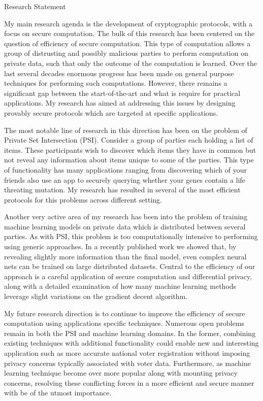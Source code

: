 \documentclass{resume} %
\begin{document}
	
	
	\begin{rSection}{Research Statement}
		
		My main research agenda is the development of cryptographic protocols, with a focus on secure computation. The bulk of this research has been centered on the question of efficiency of secure computation. This type of computation allows a group of distrusting and possibly malicious parties to perform computation on private data, such that only the outcome of the computation is learned. Over the last several decades enormous progress has been made on general purpose techniques for performing such computations. However, there remains a significant gap between the start-of-the-art and what is require for practical applications. My research has aimed at addressing this issues by designing provably secure protocols which are targeted at specific applications.
		
		The most notable line of research in this direction has been on the problem of Private Set Intersection (PSI). Consider a group of parties each holding a list of items. These participants wish to discover which items they have in common but not reveal any  information about items unique to some of the parties. This type of functionality has many applications ranging from discovering which of your friends also use an app to securely querying whether your genes contain a life threating mutation. My research has resulted in several of the most efficient protocols for this problems across different setting.
		
		Another very active area of my research has been into the problem of training machine learning models on private data which is distributed between several parties. As with PSI, this problem is too computationally intensive to performing using generic approaches. In a recently published work we showed that, by revealing slightly more information than the final model, even complex neural nets can be trained on large distributed datasets. Central to the efficiency of our approach is a careful application of secure computation and differential privacy, along with a detailed examination of how many machine learning methods leverage slight variations on the gradient decent algorithm.  
		
		My future research direction is to continue to improve the efficiency of secure computation using applications specific techniques. Numerous open problems remain in both the PSI and machine learning domains. In the former, combining existing techniques with additional functionality could enable new and interesting application such as more accurate national voter registration without imposing privacy concerns typically associated with voter data. Furthermore, as machine learning technique become over more popular along with mounting privacy concerns, resolving these conflicting  forces in a more efficient and secure manner with be of the utmost importance.
		
		
		
	\end{rSection}
	
\end{document}
